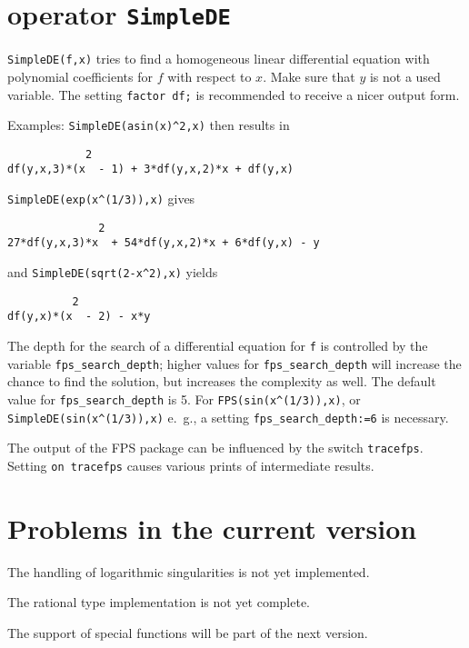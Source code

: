 \section{\REDUCE{} operator {\tt SimpleDE}}

{\tt SimpleDE(f,x)} tries to find a homogeneous linear differential
equation with polynomial coefficients for $f$ with respect to $x$.
Make sure that $y$ is not a used variable.
The setting {\tt factor df;} is recommended to receive a nicer output form.

Examples: {\tt SimpleDE(asin(x)\verb+^+2,x)} then results in
\begin{verbatim}
            2
df(y,x,3)*(x  - 1) + 3*df(y,x,2)*x + df(y,x)
\end{verbatim}
{\tt SimpleDE(exp(x\verb+^+(1/3)),x)} gives
\begin{verbatim}
              2
27*df(y,x,3)*x  + 54*df(y,x,2)*x + 6*df(y,x) - y
\end{verbatim}
and {\tt SimpleDE(sqrt(2-x\verb+^+2),x)} yields
\begin{verbatim}
          2
df(y,x)*(x  - 2) - x*y
\end{verbatim}
The depth for the search of a differential equation for {\tt f} is
controlled by the variable {\tt fps\verb+_+search\verb+_+depth};
higher values for {\tt fps\verb+_+search\verb+_+depth}
will increase the chance to find the solution, but increases the
complexity as well. The default value for {\tt fps\verb+_+search\verb+_+depth} 
is 5. For {\tt FPS(sin(x\verb+^+(1/3)),x)}, or 
{\tt SimpleDE(sin(x\verb+^+(1/3)),x)} e.\ g., a setting
{\tt fps\verb+_+search\verb+_+depth:=6} is necessary.

The output of the FPS package can be influenced by the
switch {\tt tracefps}. Setting {\tt on tracefps} causes various
prints of intermediate results.

\section{Problems in the current version}
The handling of logarithmic singularities is not yet implemented.

The rational type implementation is not yet complete.

The support of special functions \cite{Koepf:94}
will be part of the next version.

